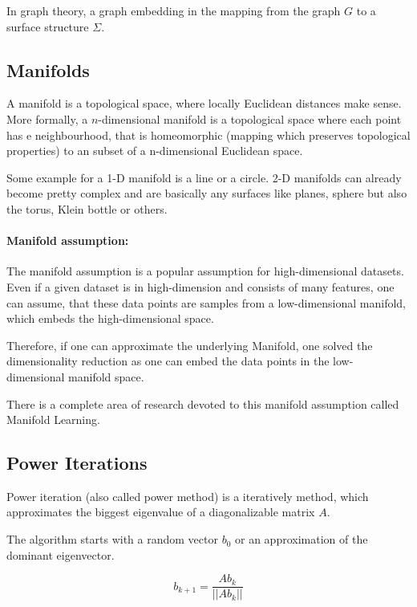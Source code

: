 In graph theory, a graph embedding in the mapping from the graph $G$ to a surface structure $\Sigma$. 


\subsection{Manifolds}
A manifold is a topological space, where locally Euclidean distances make sense.
More formally, a $n$-dimensional manifold is a topological space where
each point has e neighbourhood, that is homeomorphic (mapping which preserves topological properties) to an subset of a n-dimensional
Euclidean space.

Some example for a 1-D manifold is a line or a circle. 2-D manifolds can already become 
pretty complex and are basically any surfaces like planes, sphere but also the torus,
Klein bottle or others.

\paragraph{Manifold assumption:}
\label{sec:manifoldAssumption}

The manifold assumption is a popular assumption for high-dimensional datasets.
Even if a given dataset is in high-dimension and consists of many features, one can assume,
that these data points are samples from a low-dimensional manifold, 
which embeds the high-dimensional space.

Therefore, if one can approximate the underlying Manifold, one solved the dimensionality reduction
as one can embed the data points in the low-dimensional manifold space.

There is a complete area of research devoted to this manifold assumption called Manifold Learning\cite{ManifoldLearning}.

\subsection{Power Iterations}
\label{sec:powerIterations}

Power iteration (also called power method) is a iteratively method, 
which approximates the biggest eigenvalue of a diagonalizable matrix $A$.

The algorithm starts with a random vector $b_0$ or an approximation of the dominant eigenvector.

\begin{equation}
    \label{eq:powerIterations}
    b_{k+1} = \frac{Ab_k}{||Ab_k||}
\end{equation}

